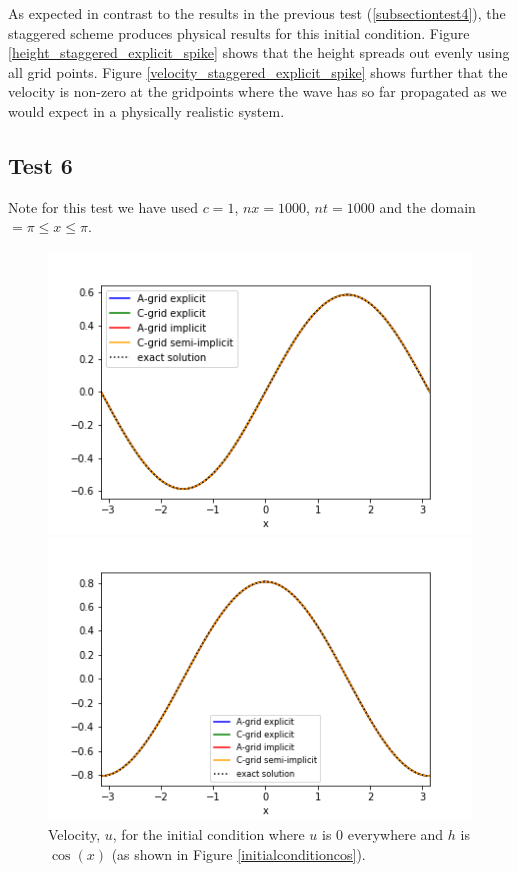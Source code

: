 \documentclass[a4paper,12pt, notitlepage]{article}
\begin{document}
{As expected in contrast to the results in the previous test (\ref{subsectiontest4}), the staggered scheme produces physical results for this initial condition. Figure \ref{height_staggered_explicit_spike} shows that the height spreads out evenly using all grid points. Figure \ref{velocity_staggered_explicit_spike} shows further that the velocity is non-zero at the gridpoints where the wave has so far propagated as we would expect in a physically realistic system.

\subsection{Test 6}

Note for this test we have used $c = 1$, $nx = 1000$, $nt = 1000$ and the domain $=\pi\leq x \leq \pi$.
\begin{figure} [H]
	\begin{minipage}{.5\textwidth}
		\ContinuedFloat*
		\captionsetup{width=0.9\textwidth}
		\captionsetup{justification=centering}
		\includegraphics[width=\textwidth]{comparison_with_exact_u.png}
		\caption{\label{exact velocity} Velocity, $u$, for the initial condition where $u$ is 0 everywhere and $h$ is $\cos(x)$ (as shown in Figure \ref{initialconditioncos}). } 
	\end{minipage}
	\begin{minipage}{.5\textwidth}
		\ContinuedFloat
		\captionsetup{width=0.9\textwidth}
		\captionsetup{justification=centering}
		\includegraphics[width=\textwidth]{comparison_with_exact_h.png}

\end{minipage}
\end{figure}}
\end{document}
